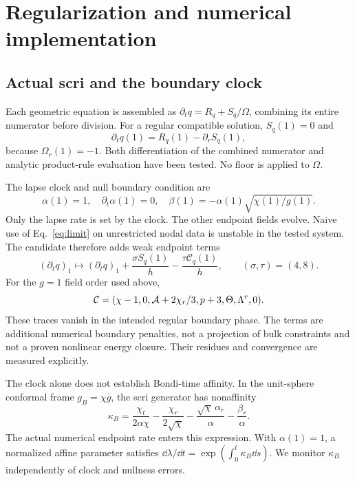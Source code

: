 \section{Regularization and numerical implementation}
\label{sec:numerics}
\subsection{Actual scri and the boundary clock}
Each geometric equation is assembled as $\partial_tq=R_q+S_q/\Omega$, combining its entire numerator before division. For a regular compatible solution, $S_q(1)=0$ and
\begin{equation}
 \partial_tq(1)=R_q(1)-\partial_rS_q(1),
\label{eq:limit}
\end{equation}
because $\Omega_r(1)=-1$. Both differentiation of the combined numerator and analytic product-rule evaluation have been tested. No floor is applied to $\Omega$.

The lapse clock and null boundary condition are
\begin{equation}
 \alpha(1)=1,\quad \partial_t\alpha(1)=0,\quad
 \beta(1)=-\alpha(1)\sqrt{\chi(1)/g(1)}.
\end{equation}
Only the lapse rate is set by the clock. The other endpoint fields evolve. Naive use of Eq.~\eqref{eq:limit} on unrestricted nodal data is unstable in the tested system. The candidate therefore adds weak endpoint terms
\begin{equation}
 (\partial_tq)_1\longmapsto(\partial_tq)_1+
 \frac{\sigma S_q(1)}{h}-\frac{\tau\mathcal C_q(1)}{h},
 \qquad (\sigma,\tau)=(4,8).
\label{eq:penalty}
\end{equation}
For the $g=1$ field order used above,
\begin{equation}
 \mathcal C=(\chi-1,0,\mathcal A+2\chi_r/3,p+3,\Theta,\Lambda^r,0).
\end{equation}
These traces vanish in the intended regular boundary phase. The terms are additional numerical boundary penalties, not a projection of bulk constraints and not a proven nonlinear energy closure. Their residues and convergence are measured explicitly.

The clock alone does not establish Bondi-time affinity. In the unit-sphere conformal frame $g_B=\chi\bar g$, the scri generator has nonaffinity
\begin{equation}
 \kappa_B=\frac{\chi_t}{2\alpha\chi}
 -\frac{\chi_r}{2\sqrt\chi}
 -\frac{\sqrt\chi\,\alpha_r}{\alpha}-\frac{\beta_r}{\alpha}.
\label{eq:affinity}
\end{equation}
The actual numerical endpoint rate enters this expression. With $\alpha(1)=1$, a normalized affine parameter satisfies $\dd\lambda/\dd t=\exp(\int_0^t\kappa_B\dd s)$. We monitor $\kappa_B$ independently of clock and nullness errors.

